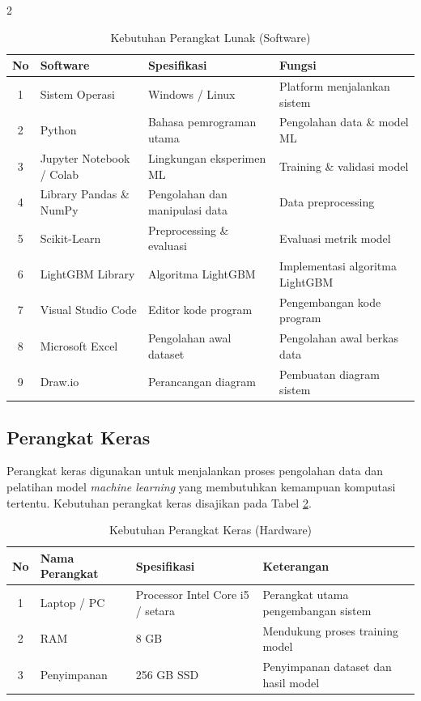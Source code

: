 \documentclass[12pt, a4paper, onecolumn, oneside]{report}
\begin{document}
\begin{spacing}{2}
\begin{table}[H]
\centering
\caption{Kebutuhan Perangkat Lunak (Software)}
\label{tab:software_req}
\begin{tabularx}{\textwidth}{|c|p{3.5cm}|p{5.5cm}|X|}
\hline
\textbf{No} & \textbf{Software} & \textbf{Spesifikasi} & \textbf{Fungsi} \\ \hline
1 & Sistem Operasi & Windows / Linux & Platform menjalankan sistem \\ \hline
2 & Python & Bahasa pemrograman utama & Pengolahan data \& model ML \\ \hline
3 & Jupyter Notebook / Colab & Lingkungan eksperimen ML & Training \& validasi model \\ \hline
4 & Library Pandas \& NumPy & Pengolahan dan manipulasi data & Data preprocessing \\ \hline
5 & Scikit-Learn & Preprocessing \& evaluasi & Evaluasi metrik model \\ \hline
6 & LightGBM Library & Algoritma LightGBM & Implementasi algoritma LightGBM \\ \hline
7 & Visual Studio Code & Editor kode program & Pengembangan kode program \\ \hline
8 & Microsoft Excel & Pengolahan awal dataset & Pengolahan awal berkas data \\ \hline
9 & Draw.io & Perancangan diagram & Pembuatan diagram sistem \\ \hline
\end{tabularx}
\end{table}

\subsection{Perangkat Keras}
Perangkat keras digunakan untuk menjalankan proses pengolahan data dan pelatihan model \textit{machine learning} yang membutuhkan kemampuan komputasi tertentu. Kebutuhan perangkat keras disajikan pada Tabel \ref{tab:hardware_req}.

\begin{table}[H]
\centering
\caption{Kebutuhan Perangkat Keras (Hardware)}
\label{tab:hardware_req}
\begin{tabularx}{\textwidth}{|c|p{3.5cm}|p{4.5cm}|X|}
\hline
\textbf{No} & \textbf{Nama Perangkat} & \textbf{Spesifikasi} & \textbf{Keterangan} \\ \hline
1 & Laptop / PC & Processor Intel Core i5 / setara & Perangkat utama pengembangan sistem \\ \hline
2 & RAM & 8 GB & Mendukung proses training model \\ \hline
3 & Penyimpanan & 256 GB SSD & Penyimpanan dataset dan hasil model \\ \hline
\end{tabularx}
\end{table}


\end{spacing}
\end{document}
